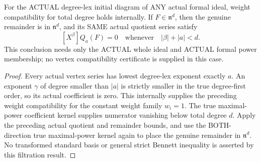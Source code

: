 \begin{theorem}
\label{hir:actual-formal-degreelex-division-maximal-filtration}
For the ACTUAL degree-lex initial diagram of ANY actual formal ideal,
weight compatibility for total degree holds internally. If
$F\in\mathfrak n^d$, then the genuine remainder is in
$\mathfrak n^d$, and its SAME actual quotient series satisfy
\[
 [X^\beta]Q_a(F)=0\quad\text{whenever}\quad |\beta|+|a|<d.
\]
This conclusion needs only the ACTUAL whole ideal and ACTUAL formal power
membership; no vertex compatibility certificate is supplied in this case.
\leanok
\end{theorem}
\begin{proof}
Every actual vertex series has lowest degree-lex exponent exactly $a$.
An exponent $\gamma$ of degree smaller than $|a|$ is strictly smaller
in the true degree-first order, so its actual coefficient is zero.
This internally supplies the preceding weight compatibility for the
constant weight family $w_i=1$. The true maximal-power coefficient
kernel supplies numerator vanishing below total degree $d$.
Apply the preceding actual quotient and remainder bounds, and use the
BOTH-direction true maximal-power kernel again to place the genuine
remainder in $\mathfrak n^d$. No transformed standard basis or general
strict Bennett inequality is asserted by this filtration result.
\end{proof}
